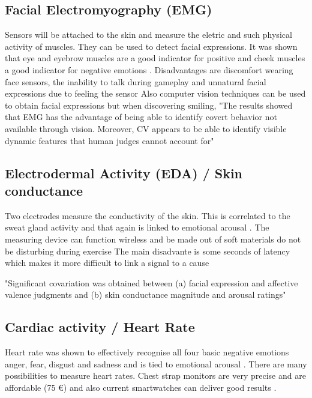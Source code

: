 \subsection{Facial Electromyography (EMG)}
Sensors will be attached to the skin and measure the eletric and such physical activity of muscles. They can be used to detect facial expressions. It was shown that eye \cite{ravaja2018phasic} and eyebrow muscles are a good indicator for positive and cheek muscles a good indicator for negative emotions \cite{nacke2015physiological,mandryk2006using}. 
Disadvantages are discomfort wearing face sensors, the inability to talk during gameplay and unnatural facial expressions due to feeling the sensor \cite{nacke2015physiological}
Also computer vision techniques can be used to obtain facial expressions but when discovering smiling, "The results showed that EMG has the advantage of
being able to identify covert behavior not available through
vision. Moreover, CV appears to be able to identify visible
dynamic features that human judges cannot account for" \cite{hernandez19invisible}

\subsection{Electrodermal Activity (EDA) / Skin conductance}
Two electrodes measure the conductivity of the skin. This is correlated to the sweat gland activity and that again is linked to emotional arousal \cite{nacke2015physiological, dawson2000electrodermal}. The measuring device can function wireless and be made out of soft materials \cite{kim2021soft} do not be disturbing during exercise 
The main disadvante is some seconds of latency which makes it more difficult to link a signal to a cause \cite{nacke2015physiological} 

"Significant covariation was obtained between (a) facial expression and affective valence judgments and (b) skin conductance magnitude and arousal ratings" \cite{lang93pictures}

\subsection{Cardiac activity / Heart Rate}
Heart rate was shown to effectively recognise all four basic negative emotions anger, fear, disgust and sadness \cite{levenson2003blood} and is tied to emotional arousal \cite{nacke2015physiological}. There are many possibilities to measure heart rates. Chest strap monitors are very precise and are affordable (75 €) \cite{link_herzfrequenzsensor} and also current smartwatches can deliver good results \cite{gillinov2017variable}.

